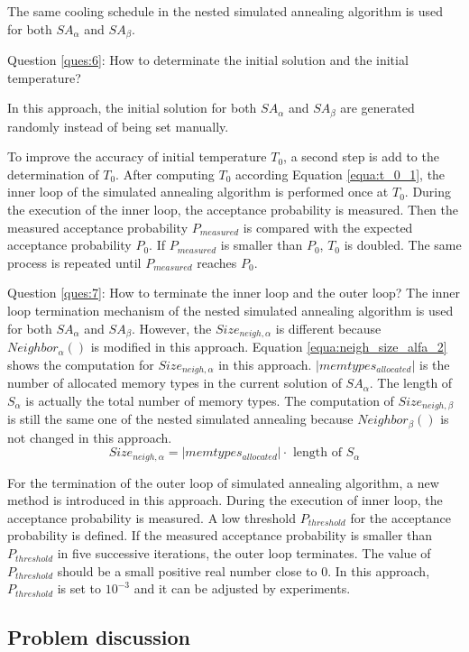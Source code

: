 		The same cooling schedule in the nested simulated annealing algorithm is
		used for both $SA_{\alpha}$ and $SA_{\beta}$.
		
		Question \ref{ques:6}: How to determinate the initial solution and the
		initial temperature?
		
		In this approach, the initial solution for both $SA_{\alpha}$
		and $SA_{\beta}$ are generated randomly instead of being set manually.
		
		To improve the accuracy of initial temperature $T_{0}$, a second step is
		add to the determination of $T_{0}$. After computing $T_{0}$ according
		Equation \ref{equa:t_0_1}, the inner loop of the simulated annealing
		algorithm is performed once at $T_{0}$.
		During the execution of the inner loop, the acceptance probability is measured.
		Then the measured acceptance probability $P_{measured}$ is compared with the
		expected acceptance probability $P_{0}$. If $P_{measured}$ is smaller than
		$P_{0}$, $T_{0}$ is doubled. The same process is repeated until $P_{measured}$
		reaches $P_{0}$.
		
		Question \ref{ques:7}: How to terminate the inner loop and the outer loop?
		The inner loop termination mechanism of the nested simulated annealing algorithm
		is used for both $SA_{\alpha}$ and $SA_{\beta}$.
		However, the $Size_{neigh,\alpha}$ is different because $Neighbor_{\alpha}()$
		is modified in this approach. Equation \ref{equa:neigh_size_alfa_2}
		shows the computation for $Size_{neigh,\alpha}$ in this approach.
		$\lvert memtypes_{allocated} \rvert$ is the number of allocated memory types in
		the current solution of $SA_{\alpha}$. The length of $S_{\alpha}$ is actually
		the total number of memory types. The computation of $Size_{neigh,\beta}$ is
		still the same one of the nested simulated annealing because $Neighbor_{\beta}()$
		is not changed in this approach.
		\begin{equation}
		\label{equa:neigh_size_alfa_2}
			Size_{neigh,\alpha}=\lvert memtypes_{allocated} \rvert \cdot \text{ length of } S_{\alpha}
		\end{equation}
		
		For the termination of the outer loop of simulated annealing algorithm,
		a new method is introduced in this approach. During the execution of inner loop,
		the acceptance probability is measured. A low threshold $P_{threshold}$ for the
		acceptance probability is defined. If the measured acceptance probability is
		smaller than $P_{threshold}$ in five successive iterations, the outer loop
		terminates. The value of $P_{threshold}$ should be a small positive real number
		close to 0. In this approach, $P_{threshold}$ is set to $10^{-3}$ and it
		can be adjusted by experiments.
		
		\subsection{Problem discussion}
		\label{subsec:problem_3}	
	
	
	